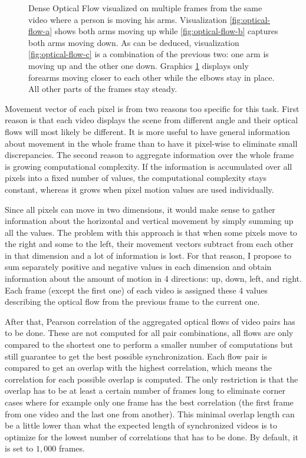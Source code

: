 \begin{figure}[!ht]
\begin{subfigure}[b]{0.244\textwidth}
        \caption{}
        \label{fig:optical-flow-d}
    \end{subfigure}
    \caption{Dense Optical Flow visualized on multiple frames from the same video where a person is moving his arms. Visualization \ref{fig:optical-flow-a} shows both arms moving up while \ref{fig:optical-flow-b} captures both arms moving down. As can be deduced, visualization \ref{fig:optical-flow-c} is a combination of the previous two: one arm is moving up and the other one down. Graphics \ref{fig:optical-flow-d} displays only forearms moving closer to each other while the elbows stay in place. All other parts of the frames stay steady.}
    \label{fig:optical-flow}
\end{figure}

Movement vector of each pixel is from two reasons too specific for this task. First reason is that each video displays the scene from different angle and their optical flows will most likely be different. It is more useful to have general information about movement in the whole frame than to have it pixel-wise to eliminate small discrepancies. The second reason to aggregate information over the whole frame is growing computational complexity. If the information is accumulated over all pixels into a fixed number of values, the computational complexity stays constant, whereas it grows when pixel motion values are used individually. 

Since all pixels can move in two dimensions, it would make sense to gather information about the horizontal and vertical movement by simply summing up all the values. The problem with this approach is that when some pixels move to the right and some to the left, their movement vectors subtract from each other in that dimension and a lot of information is lost. For that reason, I propose to sum separately positive and negative values in each dimension and obtain information about the amount of motion in 4 directions: up, down, left, and right. Each frame (except the first one) of each video is assigned these 4 values describing the optical flow from the previous frame to the current one.

After that, Pearson correlation of the aggregated optical flows of video pairs has to be done. These are not computed for all pair combinations, all flows are only compared to the shortest one to perform a smaller number of computations but still guarantee to get the best possible synchronization. Each flow pair is compared to get an overlap with the highest correlation, which means the correlation for each possible overlap is computed. The only restriction is that the overlap has to be at least a certain number of frames long to eliminate corner cases where for example only one frame has the best correlation (the first frame from one video and the last one from another). This minimal overlap length can be a little lower than what the expected length of synchronized videos is to optimize for the lowest number of correlations that has to be done. By default, it is set to $1{,}000$ frames.

